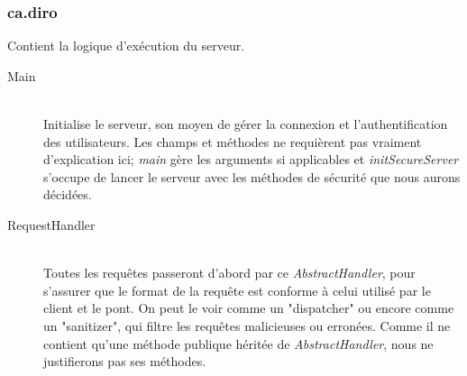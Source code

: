 \documentclass[10pt,a4paper]{report}
\begin{document}
\begin{flushleft}
\subsubsection*{ca.diro}
Contient la logique d'exécution du serveur.\\
\bigskip
\begin{description}
\item[Main] \hfill \\ Initialise le serveur, son moyen de gérer la connexion et l'authentification des utilisateurs. Les champs et méthodes ne requièrent pas vraiment d'explication ici; \emph{main} gère les arguments si applicables et \textit{initSecureServer} s'occupe de lancer le serveur avec les méthodes de sécurité que nous aurons décidées.\\
\item[RequestHandler] \hfill \\ Toutes les requêtes passeront d'abord par ce \emph{AbstractHandler}, pour s'assurer que le format de la requête est conforme à celui utilisé par le client et le pont. On peut le voir comme un "dispatcher" ou encore comme un "sanitizer", qui filtre les requêtes malicieuses ou erronées. Comme il ne contient qu'une méthode publique héritée de \emph{AbstractHandler}, nous ne justifierons pas ses méthodes.\\
\end{description}
\bigskip

\end{flushleft}
\end{document}
